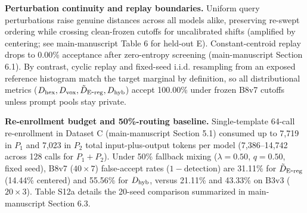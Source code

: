 \textbf{Perturbation continuity and replay boundaries.} Uniform query perturbations raise genuine distances across all models alike, preserving re-swept ordering while crossing clean-frozen cutoffs for uncalibrated shifts (amplified by centering; see main-manuscript Table 6 for held-out E). Constant-centroid replay drops to 0.00\% acceptance after zero-entropy screening (main-manuscript Section 6.1). By contrast, cyclic replay and fixed-seed i.i.d. resampling from an exposed reference histogram match the target marginal by definition, so all distributional metrics ($D_{\mathrm{hex}}{}, D_{\mathrm{vox}}{}, \tilde D_{\mathrm{E\mbox{-}reg}}{}, D_{\mathrm{hyb}}{}$) accept 100.00\% under frozen B8v7 cutoffs unless prompt pools stay private.


\textbf{Re-enrollment budget and 50\%-routing baseline.} Single-template 64-call re-enrollment in Dataset C (main-manuscript Section 5.1) consumed up to 7,719 in $P_1$ and 7,023 in $P_2$ total input-plus-output tokens per model (7,386--14,742 across 128 calls for $P_1+P_2$). Under 50\% fallback mixing ($\lambda = 0.50$, $q=0.50$, fixed seed), B8v7 ($40\times 7$) false-accept rates ($1 - \text{detection}$) are 31.11\% for $\tilde D_{\mathrm{E\mbox{-}reg}}{}$ (14.44\% centered) and 55.56\% for $D_{\mathrm{hyb}}{}$, versus 21.11\% and 43.33\% on B3v3 ($20\times 3$). Table S12a details the 20-seed comparison summarized in main-manuscript Section 6.3.


